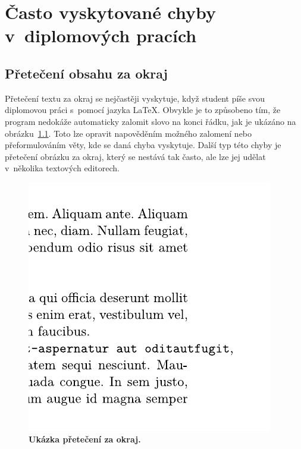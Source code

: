 



\chapter{Často vyskytované chyby v~diplomových pracích}
\cite{Ctenar_12_2015}

\dummyShortText[6]

\dummyText


\section{Přetečení obsahu za okraj}
Přetečení textu za okraj se nejčastěji vyskytuje, když student píše svou diplomovou
práci s~pomocí jazyka {\LaTeX}. Obvykle je to způsobeno tím, že program nedokáže
automaticky zalomit slovo na konci řádku, jak je ukázáno na
obrázku~\ref{pic_overflow}. Toto lze opravit napověděním možného
zalomení nebo přeformulováním věty, kde se daná chyba vyskytuje.
Další typ této chyby je přetečení obrázku za okraj,
který se nestává tak často, ale lze jej udělat v~několika textových editorech.

\begin{figure}[H]
    \label{pic_overflow}
    \centering
    \includegraphics{obrazky-figures/overflow.pdf}
    \caption{\textbf{Ukázka přetečení za okraj.} }
\end{figure}


